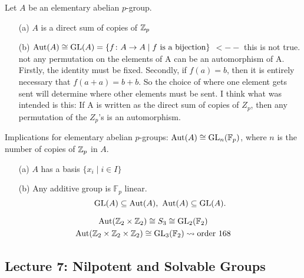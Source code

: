 \documentclass[11pt,leqno,oneside]{amsart}
\newcommand{\Fp}{{\mathbb{F}_p}} %
\newcommand{\Aut}{\text{Aut}}  %
\begin{document}
\begin{cor}[1.2.14]
  Let \(A\) be an elementary abelian
  \(p\)-group.
  \begin{enumerate}
  \item[(a)] \(A\) is a direct sum of
    copies of \({\mathbb Z}_p\)
  \item[(b)]
    \(\Aut(A) \isom \GL(A)=\{f \colon A
    \to A \mid f \text{ is a
      bijection}\}\) $<--$ this is not true.  not any permutation on the elements of A can be an automorphism of A.  Firstly, the identity must be fixed.  Secondly, if $f(a) = b$, then it is entirely necessary that $f(a+a) = b+b$.  So the choice of where one element gets sent will determine where other elements must be sent.  I think what was intended is this:  If A is written as the direct sum of copies of $Z_p$, then any permutation of the $Z_p$'s is an automorphism.
  \end{enumerate}
\end{cor}

Implications for elementary abelian
\(p\)-groups: \(\Aut(A) \isom \GL_n(\Fp)\), where $n$ is the number of copies of ${\mathbb Z}_p$ in $A$.
\begin{enumerate}
\item[(a)] \(A\) has a basis
  \(\{x_i \mid i \in I\}\)
\item[(b)] Any additive group is \(\Fp\)
  linear.
  \[\GL(A) \subseteq \Aut(A),\ \Aut(A)
    \subseteq \GL(A).\]
\end{enumerate}

\begin{example*}
  \begin{gather*}
    \Aut(\Z_2 \times \Z_2) \isom S_3 \isom \GL_2(\mathbb{F}_2)\\
    \Aut(\Z_2 \times \Z_2 \times \Z_2)
    \isom \GL_3(\mathbb{F}_2)
    \rightsquigarrow \text{order 168}
  \end{gather*}
\end{example*}

\subsection*{Lecture 7: Nilpotent and Solvable Groups}
\end{document}
